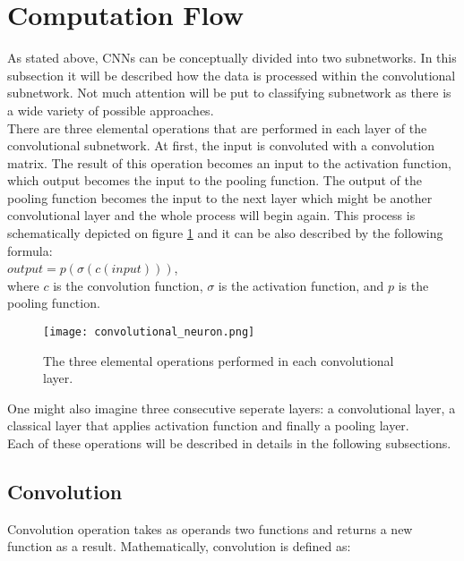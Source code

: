 \documentclass[a4paper,10pt]{report}
\begin{document}
      \section{Computation Flow}
	As stated above, CNNs can be conceptually divided into two subnetworks. In this subsection it will be described how the data is processed within the convolutional subnetwork. Not much attention will be put to classifying subnetwork as there is a wide variety of possible approaches.\\
	
	There are three elemental operations that are performed in each layer of the convolutional subnetwork. At first, the input is convoluted with a convolution matrix. The result of this operation becomes an input to the activation function, which output becomes the input to the pooling function. The output of the pooling function becomes the input to the next layer which might be another convolutional layer and the whole process will begin again. This process is schematically depicted on figure \ref{fig:con_neur} and it can be also described by the following formula:\\
	
	$output = p(\sigma(c(input)))$,\\
	
	where $c$ is the convolution function, $\sigma$ is the activation function, and $p$ is the pooling function.\\
	
	\begin{figure}[h!]
	  \centering
	  \texttt{[image: convolutional\_neuron.png]}
	  \caption{The three elemental operations performed in each convolutional layer.}
	  \label{fig:con_neur}
	\end{figure} 
	
	  
	One might also imagine three consecutive seperate layers: a convolutional layer, a classical layer that applies activation function and finally a pooling layer.\\
	
	Each of these operations will be described in details in the following subsections.\\
	
	\subsection{Convolution}\label{sec:convolution}
	Convolution operation takes as operands two functions and returns a new function as a result. Mathematically, convolution is defined as: \\
	
\end{document}
